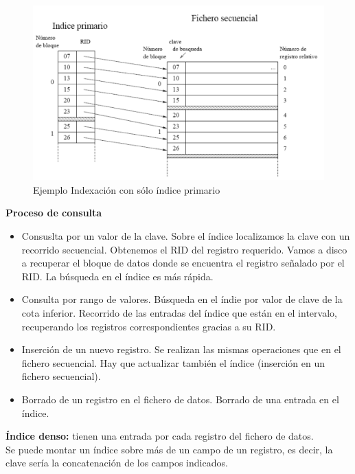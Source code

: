 \documentclass[a4paper,11pt]{article}
\begin{document}
\begin{figure}
\centering
\caption{Ejemplo Indexación con sólo índice primario}
\includegraphics[scale=1,width=1\textwidth]{ejemplo_indexado.png}
\end{figure}

\textbf{Proceso de consulta}
\begin{itemize}
\item Consuslta por un valor de la clave. Sobre el índice localizamos la clave con un recorrido secuencial. Obtenemos el RID del registro requerido. Vamos a disco a recuperar el bloque de datos donde se encuentra el registro señalado por el RID. La búsqueda en el índice es más rápida.

\item Consulta por rango de valores. Búsqueda en el índie por valor de clave de la cota inferior. Recorrido de las entradas del índice que están en el intervalo, recuperando los registros correspondientes gracias a su RID.

\end{itemize}

\begin{itemize}
\item Inserción de un nuevo registro. Se realizan las mismas operaciones que en el fichero secuencial. Hay que actualizar también el índice (inserción en un fichero secuencial).

\item Borrado de un registro en el fichero de datos. Borrado de una entrada en el índice.
\end{itemize}

\textbf{Índice denso:} tienen una entrada por cada registro del fichero de datos. \\

Se puede montar un índice sobre más de un campo de un registro, es decir, la clave sería la concatenación de los campos indicados. \\
\end{document}
